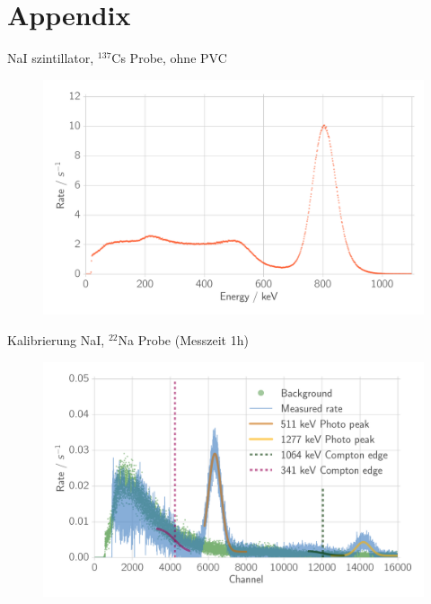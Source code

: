 \documentclass[xcolor=x11names,compress]{beamer}
\renewcommand{\(}{\begin{columns}}
\renewcommand{\)}{\end{columns}}
\newcommand{\<}[1]{\begin{column}{#1}}
\renewcommand{\>}{\end{column}}
\begin{document}

\section{Appendix}
\label{sec:appendix}
\begin{frame}[t]{NaI szintillator, $^{137}$Cs Probe, ohne PVC}
 \begin{figure}[htpb]
    \centering
    \includegraphics[width=1.0\linewidth]{../analysis/figures/na_total_incident}
    \label{fig:histo_na_137cs}
\end{figure}
\end{frame}

\begin{frame}[t]{Kalibrierung NaI, $^{22}$Na Probe (Messzeit 1h) }
\begin{figure}[htpb]
    \centering
    \includegraphics[width=1.0\linewidth]{../analysis/figures/histo_na_22na}
\label{fig:histo_na_22na}
\end{figure}
\end{frame}
\end{document}
